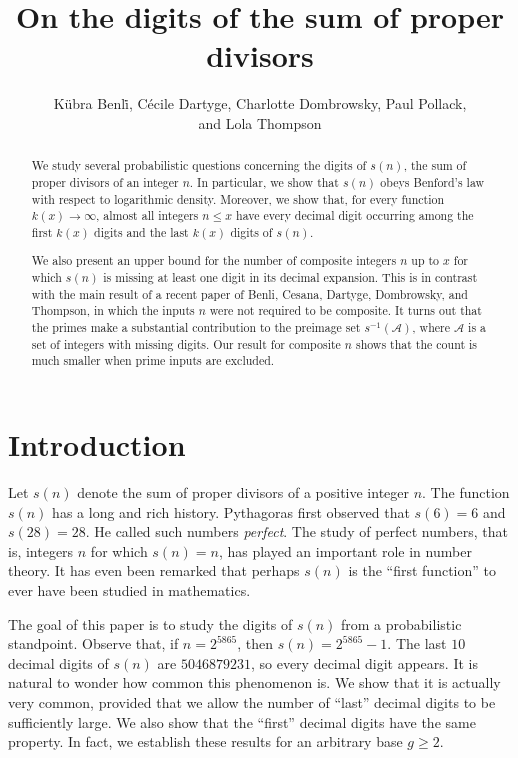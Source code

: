 \documentclass[11pt, reqno]{amsart}
\title{On the digits of the sum of proper divisors}
\author{K\"{u}bra Benl\.{i}, C\'{e}cile Dartyge, Charlotte Dombrowsky, Paul Pollack,\\ and Lola Thompson}
\theoremstyle{remark}
\numberwithin{theorem}{section}
\numberwithin{proposition}{section}
\numberwithin{lemma}{section}
\numberwithin{corollary}{section}
\numberwithin{equation}{section}
\numberwithin{conjecture}{section}
\numberwithin{definition}{section}
\begin{document}
\begin{abstract}
    We study several probabilistic questions concerning the digits of $s(n)$, the sum of proper divisors of an integer $n$. In particular, we show that $s(n)$ obeys Benford’s law with respect to logarithmic density. Moreover, we show that, for every function $k(x) \rightarrow \infty$, almost all integers $n \leq x$ have every decimal digit occurring among the first $k(x)$ digits and the last $k(x)$ digits of $s(n).$
    
    We also present an upper bound for the number of composite integers $n$ up to $x$ for which $s(n)$ is missing at least one digit in its decimal expansion. This is in contrast with the main result of a recent paper of Benli, Cesana, Dartyge, Dombrowsky, and Thompson, in which the inputs $n$ were not required to be composite. It turns out that the primes make a substantial contribution to the preimage set $s^{-1}(\mathcal{A})$, where $\mathcal{A}$ is a set of integers with missing digits. Our result for composite $n$ shows that the count is much smaller when prime inputs are excluded. 
  
\end{abstract}

\maketitle


\section{Introduction}

Let $s(n)$ denote the sum of proper divisors of a positive integer $n$. The function $s(n)$ has a long and rich history. Pythagoras first observed that $s(6) = 6$ and $s(28) = 28.$ He called such numbers \textit{perfect}. The study of perfect numbers, that is, integers $n$ for which $s(n) = n$, has played an important role in number theory. It has even been remarked \cite{pomerance} that perhaps $s(n)$ is the ``first function'' to ever have been studied in mathematics. 

The goal of this paper is to study the digits of $s(n)$ from a probabilistic standpoint. Observe that, if $n = 2^{5865}$, then $s(n) = 2^{5865} - 1.$ The last $10$ decimal digits of $s(n)$ are $5046879231$, so every decimal digit appears. It is natural to wonder how common this phenomenon is. We show that it is actually very common, provided that we allow the number of ``last'' decimal digits to be sufficiently large. We also show that the ``first'' decimal digits have the same property. In fact, we establish these results for an arbitrary base $g\ge 2$.
\end{document}
